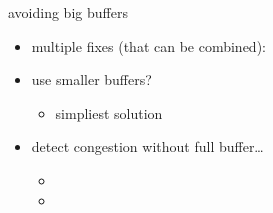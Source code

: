 \begin{frame}{avoiding big buffers}
    \begin{itemize}
    \item multiple fixes (that can be combined):
    \vspace{.5cm}
    \item use smaller buffers?
        \begin{itemize}
        \item simpliest solution
        \end{itemize}
    \item detect congestion without full buffer\ldots
        \begin{itemize}
        \item {}
        \item {}
        \end{itemize}
    \end{itemize}
\end{frame}
